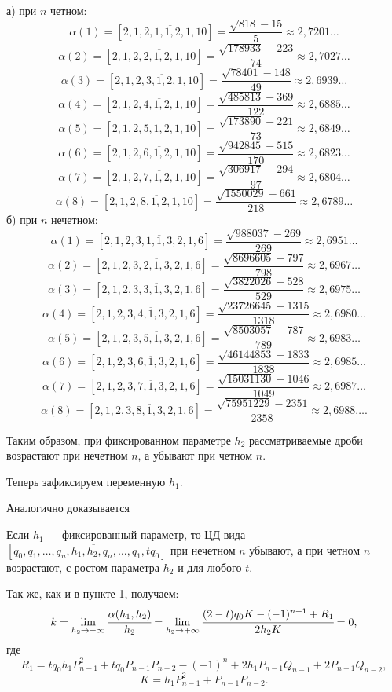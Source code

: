 \begin{exampler}
а) при $n$ четном:
$$\alpha(1)=[2,\overline{1,2,1,1,2,1,10}]=\frac {\sqrt{818}-15}{5}\approx 2,7201\dots$$
$$\alpha(2)=[2,\overline{1,2,2,1,2,1,10}]=\frac {\sqrt{178933}-223}{74}\approx 2,7027\dots$$
$$\alpha(3)=[2,\overline{1,2,3,1,2,1,10}]=\frac {\sqrt{78401}-148}{49}\approx 2,6939\dots$$
$$\alpha(4)=[2,\overline{1,2,4,1,2,1,10}]=\frac {\sqrt{485813}-369}{122}\approx 2,6885\dots$$
$$\alpha(5)=[2,\overline{1,2,5,1,2,1,10}]=\frac {\sqrt{173890}-221}{73}\approx 2,6849\dots$$
$$\alpha(6)=[2,\overline{1,2,6,1,2,1,10}]=\frac {\sqrt{942845}-515}{170}\approx 2,6823\dots$$
$$\alpha(7)=[2,\overline{1,2,7,1,2,1,10}]=\frac {\sqrt{306917}-294}{97}\approx 2,6804\dots$$
$$\alpha(8)=[2,\overline{1,2,8,1,2,1,10}]=\frac {\sqrt{1550029}-661}{218}\approx 2,6789\dots$$
б) при $n$ нечетном:
\[\alpha(1)=[2,\overline{1,2,3,1,1,3,2,1,6}]=\frac {\sqrt{988037}-269}{269}\approx 2,6951\dots\]
\[\alpha(2)=[2,\overline{1,2,3,2,1,3,2,1,6}]=\frac {\sqrt{8696605}-797}{798}\approx 2,6967\dots\]
\[\alpha(3)=[2,\overline{1,2,3,3,1,3,2,1,6}]=\frac {\sqrt{3822026}-528}{529}\approx 2,6975\dots\]
\[\alpha(4)=[2,\overline{1,2,3,4,1,3,2,1,6}]=\frac {\sqrt{23726645}-1315}{1318}\approx 2,6980\dots\]
\[\alpha(5)=[2,\overline{1,2,3,5,1,3,2,1,6}]=\frac {\sqrt{8503057}-787}{789}\approx 2,6983\dots\]
\[\alpha(6)=[2,\overline{1,2,3,6,1,3,2,1,6}]=\frac {\sqrt{46144853}-1833}{1838}\approx 2,6985\dots\]
\[\alpha(7)=[2,\overline{1,2,3,7,1,3,2,1,6}]=\frac{\sqrt{15031130}-1046}{1049}\approx 2,6987\dots\]
\[\alpha(8)=[2,\overline{1,2,3,8,1,3,2,1,6}]=\frac {\sqrt{75951229}-2351}{2358}\approx 2,6988\dots.\]
\end{exampler}
Таким образом, при фиксированном параметре $h_2$ рассматриваемые дроби возрастают при нечетном $n$, а убывают при четном $n$.

Теперь зафиксируем переменную $h_1$.

Аналогично доказывается

\begin{theoremr}\label{PiskunovaTretuakox:th:8}
Если $h_1$ --- фиксированный параметр, то ЦД вида $[{q_0},\overline{{q_1},\dots,{q_n},{h_1},{h_2},{q_n},\dots,{q_1},t{q_0}}]$ при нечетном $n$ убывают, а при четном $n$ возрастают, с ростом параметра $h_2$ и для любого $t$.
\end{theoremr}

Так же, как и в пункте 1, получаем:
\[k=\lim_{{h_2}\to +\infty}\cfrac {\alpha(h_1,h_2)}{h_2}=\lim_{{h_2}\to +\infty}\cfrac {(2-t){q_0}K-(-1)^{n+1}+{R_1}}{2{h_2}K}=0,\]
где $$R_1=t{q_0}{h_1}{P^{2}_{n-1}}+t{q_0}{P_{n-1}}{P_{n-2}}-(-1)^{n}+2{h_1}{P_{n-1}}{Q_{n-1}}+2{P_{n-1}}{Q_{n-2}},$$
$$K={h_1}{P^{2}_{n-1}}+{P_{n-1}}{P_{n-2}}.$$

